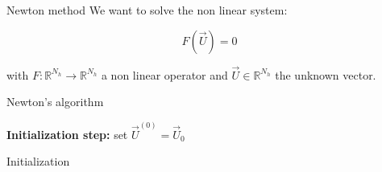 \begin{frame}{Newton method}
	We want to solve the non linear system: %

    \normalsize
    \vspace{-10pt}
    \begin{equation*}
        F(\vec{U}) = 0 
    \end{equation*}

    \vspace{-2pt}
    with $F:\mathbb{R}^{N_h} \to \mathbb{R}^{N_h}$ a non linear operator and $\vec{U}\in \mathbb{R}^{N_h}$ the unknown vector.

	\setcounter{algocf}{0}
    \begin{center}
        \small
        \begin{minipage}{0.9\linewidth}
            \begin{algorithm}[H]
                \SetAlgoLined
                \caption{Newton's algorithm \citep{newton_accel_2025}}
                \textbf{Initialization step:} set $\vec{U}^{(0)} = \vec{U}_0$\;
            \end{algorithm}
        \end{minipage}
    \end{center}

\end{frame}

\begin{frame}{Initialization }




\end{frame}